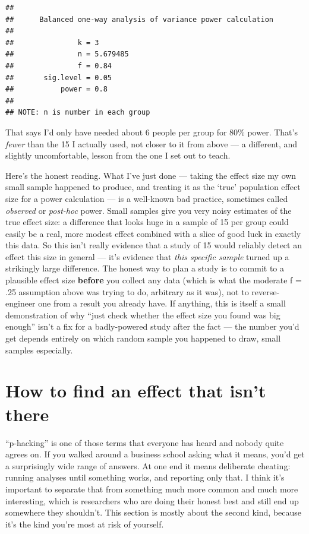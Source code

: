 \documentclass[
]{book}
\begin{document}
\begin{verbatim}
## 
##      Balanced one-way analysis of variance power calculation 
## 
##               k = 3
##               n = 5.679485
##               f = 0.84
##       sig.level = 0.05
##           power = 0.8
## 
## NOTE: n is number in each group
\end{verbatim}

That says I'd only have needed about 6 people per group for 80\% power. That's \emph{fewer} than the 15 I actually used, not closer to it from above --- a different, and slightly uncomfortable, lesson from the one I set out to teach.

Here's the honest reading. What I've just done --- taking the effect size my own small sample happened to produce, and treating it as the `true' population effect size for a power calculation --- is a well-known bad practice, sometimes called \emph{observed} or \emph{post-hoc} power. Small samples give you very noisy estimates of the true effect size: a difference that looks huge in a sample of 15 per group could easily be a real, more modest effect combined with a slice of good luck in exactly this data. So this isn't really evidence that a study of 15 would reliably detect an effect this size in general --- it's evidence that \emph{this specific sample} turned up a strikingly large difference. The honest way to plan a study is to commit to a plausible effect size \textbf{before} you collect any data (which is what the moderate f = .25 assumption above was trying to do, arbitrary as it was), not to reverse-engineer one from a result you already have. If anything, this is itself a small demonstration of why ``just check whether the effect size you found was big enough'' isn't a fix for a badly-powered study after the fact --- the number you'd get depends entirely on which random sample you happened to draw, small samples especially.

\section{How to find an effect that isn't there}\label{p-hacking-sim}

``p-hacking'' is one of those terms that everyone has heard and nobody quite agrees on. If you walked around a business school asking what it means, you'd get a surprisingly wide range of answers. At one end it means deliberate cheating: running analyses until something works, and reporting only that. I think it's important to separate that from something much more common and much more interesting, which is researchers who are doing their honest best and still end up somewhere they shouldn't. This section is mostly about the second kind, because it's the kind you're most at risk of yourself.
\end{document}
